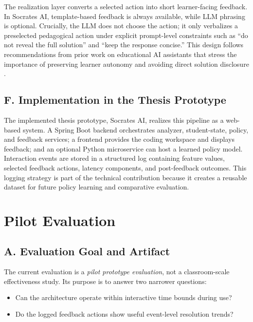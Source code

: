 ﻿\documentclass[conference]{IEEEtran}
\newcommand{\system}{Socrates AI}
\begin{document}
The realization layer converts a selected action into short learner-facing feedback. In \system{}, template-based feedback is always available, while LLM phrasing is optional. Crucially, the LLM does not choose the action; it only verbalizes a preselected pedagogical action under explicit prompt-level constraints such as ``do not reveal the full solution'' and ``keep the response concise.'' This design follows recommendations from prior work on educational AI assistants that stress the importance of preserving learner autonomy and avoiding direct solution disclosure \cite{DesirableCharacteristicsforAITeachingAssistantsinProgrammingEducation,CodeAid,AutomatingHumanTutorStyleProgrammingFeedback}.

\subsection*{F. Implementation in the Thesis Prototype}

The implemented thesis prototype, \system{}, realizes this pipeline as a web-based system. A Spring Boot backend orchestrates analyzer, student-state, policy, and feedback services; a frontend provides the coding workspace and displays feedback; and an optional Python microservice can host a learned policy model. Interaction events are stored in a structured log containing feature values, selected feedback actions, latency components, and post-feedback outcomes. This logging strategy is part of the technical contribution because it creates a reusable dataset for future policy learning and comparative evaluation.

\section{Pilot Evaluation}\label{sec:evaluation}

\subsection*{A. Evaluation Goal and Artifact}

The current evaluation is a \emph{pilot prototype evaluation}, not a classroom-scale effectiveness study. Its purpose is to answer two narrower questions:
\begin{itemize}
\item Can the architecture operate within interactive time bounds during use?
\item Do the logged feedback actions show useful event-level resolution trends?
\end{itemize}
\end{document}
